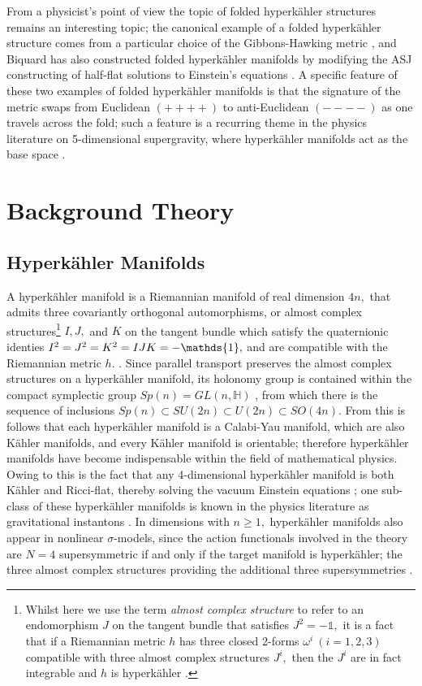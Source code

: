 \documentclass[a4paper,12pt, onecolumn, notitlepage]{article}
\theoremstyle{definition}
\theoremstyle{remark}
\newcommand{\w}{\omega}
\newcommand{\K}{K\"ahler }
\newcommand{\HK}{hyperk\"ahler }
\begin{document}
From a physicist's point of view the topic of folded \HK structures remains an interesting topic; the canonical example of a folded \HK structure comes from a particular choice of the Gibbons-Hawking metric \cite{hitchin_2015}, and Biquard \cite{biquard_2015} has also constructed folded \HK manifolds by modifying the ASJ constructing of half-flat solutions to Einstein's equations \cite{ashtekar_1988}. A specific feature of these two examples of folded \HK manifolds is that the signature of the metric swaps from Euclidean $(++++)$ to anti-Euclidean $(----)$ as one travels across the fold; such a feature is a recurring theme in the physics literature on 5-dimensional supergravity, where \HK manifolds act as the base space \cite{gibbons_2013}.


\section{Background Theory}
\subsection{Hyperk\"ahler Manifolds}

A \HK manifold is a Riemannian manifold of real dimension $4n,$ that admits three covariantly orthogonal automorphisms, or almost complex structures\footnote{Whilst here we use the term \emph{almost complex structure} to refer to an endomorphism $J$ on the tangent bundle that satisfies $J^{2}=-\mathds{1},$ it is a fact that if a Riemannian metric $h$ has three closed 2-forms $\w^{i}\ (i=1,2,3)$ compatible with three almost complex structures $J^{i},$ then the $J^{i}$ are in fact integrable and $h$ is \HK \cite{hitchin_1987}.} $I,J,$ and $K$ on the tangent bundle which satisfy the quaternionic identies $I\indices{^2}=J\indices{^2}=K\indices{^2}=IJK=-\mathds{1},$ and are compatible with the Riemannian metric $h.$ \cite{hitchin_1991}. Since parallel transport preserves the almost complex structures on a \HK manifold, its holonomy group is contained within the compact symplectic group $Sp(n) = GL(n,\mathbb{H})$ \cite{berger_1955}, from which there is the sequence of inclusions $Sp(n)\subset SU(2n)\subset U(2n) \subset SO(4n).$ From this is follows that each \HK manifold is a Calabi-Yau manifold, which are also \K manifolds, and every \K manifold is orientable; therefore \HK manifolds have become indispensable within the field of mathematical physics. Owing to this is the fact that any 4-dimensional \HK manifold is both \K and Ricci-flat, thereby solving the vacuum Einstein equations \cite{hitchin_1991}; one sub-class of these \HK manifolds is known in the physics literature as gravitational instantons \cite{dancer_1994, eguchi_1978, gibbons_1978}.
In dimensions with $n\geq1,$ \HK manifolds also appear in nonlinear $\sigma$-models, since the action functionals involved in the theory are $N=4$ supersymmetric if and only if the target manifold is hyperk\"ahler; the three almost complex structures providing the additional three supersymmetries \cite{hitchin_1987}.
\end{document}
